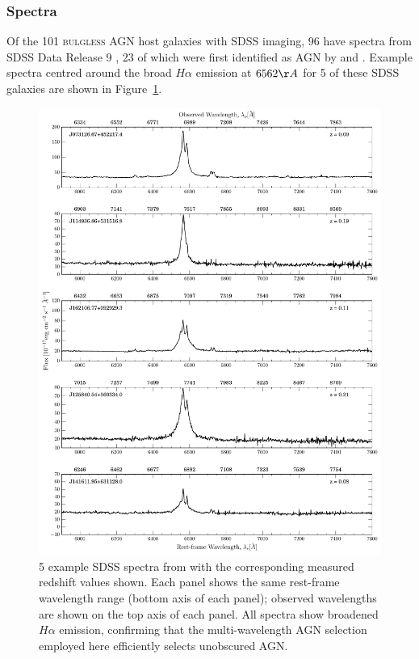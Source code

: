 \subsubsection{Spectra}\label{sec:spectra}

Of the 101 \textsc{bulgless} AGN host galaxies with SDSS imaging, 96 have spectra from SDSS Data Release 9 \citep{ahn12}, 23 of which were first identified as AGN by \cite{shen08} and \cite{edelson12}. Example spectra centred around the broad $H\alpha$ emission at $6562\AA$ for 5 of these SDSS galaxies are shown in Figure~\ref{fig:SDSSspectra}.

\begin{figure}
\centering
\includegraphics[height=0.8\textheight]{agn/sample_sdss_spectra.pdf}
\caption[Optical SDSS spectra of 5 galaxies in the \textsc{bulgeless} sample]{5 example SDSS spectra from with the corresponding measured redshift values shown. Each panel shows the same rest-frame wavelength range (bottom axis of each panel); observed wavelengths are shown on the top axis of each panel. All spectra show broadened  $H\alpha$ emission, confirming that the multi-wavelength AGN selection employed here efficiently selects unobscured AGN.}
\label{fig:SDSSspectra}
\end{figure}

